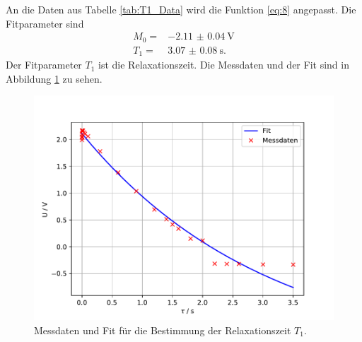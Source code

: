 An die Daten aus Tabelle \ref{tab:T1_Data} wird die Funktion \eqref{eq:8}
angepasst.
Die Fitparameter sind
\begin{align*}
  M_{\text{0}} =& \SI{-2.11(4)}{\volt}\\
  T_{\text{1}} =& \SI{3.07(8)}{\second}.
\end{align*}
Der Fitparameter $T_{\text{1}}$ ist die Relaxationszeit.
Die Messdaten und der Fit sind in Abbildung \ref{fig:T1_Data_fit} zu sehen.
\begin{figure}
  \centering
  \includegraphics[width = \textwidth, keepaspectratio]{figure/T1_fit.pdf}
  \caption{Messdaten und Fit für die Bestimmung der Relaxationszeit $T_{\text{1}}$.}
  \label{fig:T1_Data_fit}
\end{figure}
\FloatBarrier
